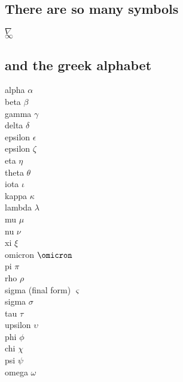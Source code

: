 \documentclass{article}
\begin{document}
\subsection{There are so many symbols}

$\nabla$
\\
$\infty$

\subsection{and the greek alphabet}

alpha $\alpha$
\\
beta $\beta$
\\
gamma $\gamma$
\\
delta $\delta$
\\
epsilon $\epsilon$
\\
epsilon $\zeta$
\\
eta $\eta$
\\
theta $\theta$
\\
iota $\iota$
\\
kappa $\kappa$
\\
lambda $\lambda$
\\
mu $\mu$
\\
nu	$\nu$
\\
xi	$\xi$
\\
omicron	$\omicron$
\\
pi	$\pi$
\\
rho	$\rho$
\\
sigma (final form)	$\varsigma$
\\
sigma	$\sigma$
\\
tau	$\tau$
\\
upsilon	$\upsilon$
\\
phi	$\phi$
\\
chi	$\chi$
\\
psi	$\psi$
\\
omega	$\omega$
\end{document}
